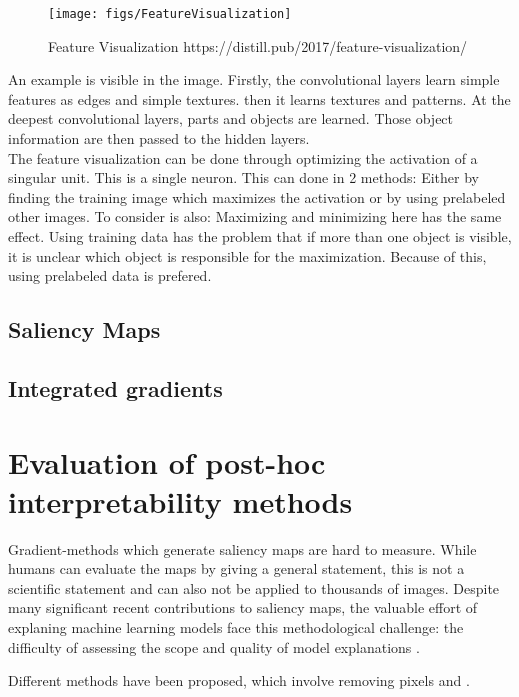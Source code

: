 \begin{figure}[h!]
	\centering
	\texttt{[image: figs/FeatureVisualization]}
	\caption{Feature Visualization https://distill.pub/2017/feature-visualization/}
	\label{fig:feature-visualization}
\end{figure}

An example is visible in the image. Firstly, the convolutional layers learn simple features as edges and simple textures. then it learns textures and patterns. At the deepest convolutional layers, parts and objects are learned. Those object information are then passed to the hidden layers.
\\

The feature visualization can be done through optimizing the activation of a singular unit. This is a single neuron. This can done in 2 methods: Either by finding the training image which maximizes the activation or by using prelabeled other images. To consider is also: Maximizing and minimizing here has the same effect.
Using training data has the problem that if more than one object is visible, it is unclear which object is responsible for the maximization. Because of this, using prelabeled data is prefered.


\subsection{Saliency Maps}

\subsection{Integrated gradients}


\section{Evaluation of post-hoc interpretability methods}

Gradient-methods which generate saliency maps are hard to measure. While humans can evaluate the maps by giving a general statement, this is not a scientific statement and can also not be applied to thousands of images. Despite many significant recent contributions to saliency maps, the valuable effort of explaning machine learning models face this methodological challenge: the difficulty of assessing the scope and quality of model explanations \cite{adebayo2020sanity}.


Different methods have been proposed, which involve removing pixels \cite{hooker2019benchmark} and \cite{gupta2022new}.




